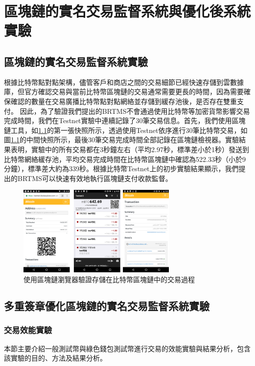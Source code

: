 
\chapter{區塊鏈的實名交易監督系統與優化後系統實驗}

	\section{區塊鏈的實名交易監督系統實驗}
	根據比特幣點對點架構，儘管客戶和商店之間的交易細節已經快速存儲到雲數據庫，但官方確認交易與當前比特幣區塊鏈的交易通常需要更長的時間，因為需要確保確認的數量在交易廣播比特幣點對點網絡並存儲到緩存池後，是否存在雙重支付。
	因此，為了驗證我們提出的BRTMS不會通過使用比特幣等加密貨幣影響交易完成時間，我們在Testnet實驗中連續記錄了30筆交易信息。首先，我們使用區塊鏈工具，如\ref{fig9}的第一張快照所示，透過使用Testnet依序進行30筆比特幣交易，如圖\ref{fig9}的中間快照所示，最後30筆交易完成時間全部記錄在區塊鏈檢視器。實驗結果表明，實驗中的所有交易都在3秒鐘左右（平均2.97秒，標準差小於1秒）發送到比特幣網絡緩存池，平均交易完成時間在比特幣區塊鏈中確認為522.33秒（小於9分鐘），標準差大約為339秒。根據比特幣Testnet上的初步實驗結果顯示，我們提出的BRTMS可以快速有效地執行區塊鏈支付收款監督。

	\begin{figure}[h]
		\centering
		\includegraphics[width = 0.7\textwidth]{fig9.png}
		\caption{使用區塊鏈瀏覽器驗證存儲在比特幣區塊鏈中的交易過程}\label{fig9}
	\end{figure}

	\section{多重簽章優化區塊鏈的實名交易監督系統實驗}
		\subsection{交易效能實驗}
		本節主要介紹一般測試幣與綠色錢包測試幣進行交易的效能實驗與結果分析，包含該實驗的目的、方法及結果分析。


